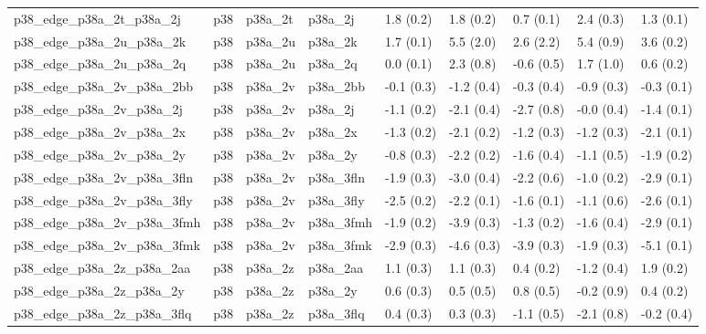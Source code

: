 \begin{tabular}{lllllllll}
p38\_edge\_p38a\_2t\_p38a\_2j         &       p38 &     p38a\_2t &     p38a\_2j &   1.8 (0.2) &         1.8 (0.2) &   0.7 (0.1) &   2.4 (0.3) &   1.3 (0.1) \\
p38\_edge\_p38a\_2u\_p38a\_2k         &       p38 &     p38a\_2u &     p38a\_2k &   1.7 (0.1) &         5.5 (2.0) &   2.6 (2.2) &   5.4 (0.9) &   3.6 (0.2) \\
p38\_edge\_p38a\_2u\_p38a\_2q         &       p38 &     p38a\_2u &     p38a\_2q &   0.0 (0.1) &         2.3 (0.8) &  -0.6 (0.5) &   1.7 (1.0) &   0.6 (0.2) \\
p38\_edge\_p38a\_2v\_p38a\_2bb        &       p38 &     p38a\_2v &    p38a\_2bb &  -0.1 (0.3) &        -1.2 (0.4) &  -0.3 (0.4) &  -0.9 (0.3) &  -0.3 (0.1) \\
p38\_edge\_p38a\_2v\_p38a\_2j         &       p38 &     p38a\_2v &     p38a\_2j &  -1.1 (0.2) &        -2.1 (0.4) &  -2.7 (0.8) &  -0.0 (0.4) &  -1.4 (0.1) \\
p38\_edge\_p38a\_2v\_p38a\_2x         &       p38 &     p38a\_2v &     p38a\_2x &  -1.3 (0.2) &        -2.1 (0.2) &  -1.2 (0.3) &  -1.2 (0.3) &  -2.1 (0.1) \\
p38\_edge\_p38a\_2v\_p38a\_2y         &       p38 &     p38a\_2v &     p38a\_2y &  -0.8 (0.3) &        -2.2 (0.2) &  -1.6 (0.4) &  -1.1 (0.5) &  -1.9 (0.2) \\
p38\_edge\_p38a\_2v\_p38a\_3fln       &       p38 &     p38a\_2v &   p38a\_3fln &  -1.9 (0.3) &        -3.0 (0.4) &  -2.2 (0.6) &  -1.0 (0.2) &  -2.9 (0.1) \\
p38\_edge\_p38a\_2v\_p38a\_3fly       &       p38 &     p38a\_2v &   p38a\_3fly &  -2.5 (0.2) &        -2.2 (0.1) &  -1.6 (0.1) &  -1.1 (0.6) &  -2.6 (0.1) \\
p38\_edge\_p38a\_2v\_p38a\_3fmh       &       p38 &     p38a\_2v &   p38a\_3fmh &  -1.9 (0.2) &        -3.9 (0.3) &  -1.3 (0.2) &  -1.6 (0.4) &  -2.9 (0.1) \\
p38\_edge\_p38a\_2v\_p38a\_3fmk       &       p38 &     p38a\_2v &   p38a\_3fmk &  -2.9 (0.3) &        -4.6 (0.3) &  -3.9 (0.3) &  -1.9 (0.3) &  -5.1 (0.1) \\
p38\_edge\_p38a\_2z\_p38a\_2aa        &       p38 &     p38a\_2z &    p38a\_2aa &   1.1 (0.3) &         1.1 (0.3) &   0.4 (0.2) &  -1.2 (0.4) &   1.9 (0.2) \\
p38\_edge\_p38a\_2z\_p38a\_2y         &       p38 &     p38a\_2z &     p38a\_2y &   0.6 (0.3) &         0.5 (0.5) &   0.8 (0.5) &  -0.2 (0.9) &   0.4 (0.2) \\
p38\_edge\_p38a\_2z\_p38a\_3flq       &       p38 &     p38a\_2z &   p38a\_3flq &   0.4 (0.3) &         0.3 (0.3) &  -1.1 (0.5) &  -2.1 (0.8) &  -0.2 (0.4) \\

\end{tabular}
